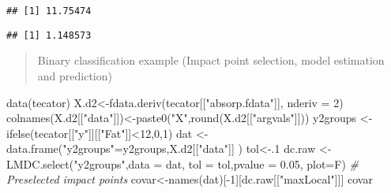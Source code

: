 \documentclass[
]{book}
\newenvironment{Shaded}{\begin{snugshade}}{\end{snugshade}}
\newcommand{\AttributeTok}[1]{\textcolor[rgb]{0.77,0.63,0.00}{#1}}
\newcommand{\CommentTok}[1]{\textcolor[rgb]{0.56,0.35,0.01}{\textit{#1}}}
\newcommand{\DecValTok}[1]{\textcolor[rgb]{0.00,0.00,0.81}{#1}}
\newcommand{\FloatTok}[1]{\textcolor[rgb]{0.00,0.00,0.81}{#1}}
\newcommand{\FunctionTok}[1]{\textcolor[rgb]{0.00,0.00,0.00}{#1}}
\newcommand{\NormalTok}[1]{#1}
\newcommand{\OtherTok}[1]{\textcolor[rgb]{0.56,0.35,0.01}{#1}}
\newcommand{\SpecialCharTok}[1]{\textcolor[rgb]{0.00,0.00,0.00}{#1}}
\newcommand{\StringTok}[1]{\textcolor[rgb]{0.31,0.60,0.02}{#1}}
\begin{document}
\begin{verbatim}
## [1] 11.75474
\end{verbatim}

\begin{Shaded}
\end{Shaded}

\begin{verbatim}
## [1] 1.148573
\end{verbatim}

\begin{quote}
Binary classification example (Impact point selection, model estimation and prediction)
\end{quote}

\begin{Shaded}
\begin{Highlighting}[]
\FunctionTok{data}\NormalTok{(tecator)}
\NormalTok{X.d2}\OtherTok{\textless{}{-}}\FunctionTok{fdata.deriv}\NormalTok{(tecator[[}\StringTok{"absorp.fdata"}\NormalTok{]],}
\AttributeTok{nderiv =} \DecValTok{2}\NormalTok{)}
\FunctionTok{colnames}\NormalTok{(X.d2[[}\StringTok{"data"}\NormalTok{]])}\OtherTok{\textless{}{-}}\FunctionTok{paste0}\NormalTok{(}\StringTok{"X"}\NormalTok{,}\FunctionTok{round}\NormalTok{(X.d2[[}\StringTok{"argvals"}\NormalTok{]]))}
\NormalTok{y2groups }\OtherTok{\textless{}{-}} \FunctionTok{ifelse}\NormalTok{(tecator[[}\StringTok{"y"}\NormalTok{]][[}\StringTok{"Fat"}\NormalTok{]]}\SpecialCharTok{\textless{}}\DecValTok{12}\NormalTok{,}\DecValTok{0}\NormalTok{,}\DecValTok{1}\NormalTok{)}
\NormalTok{dat }\OtherTok{\textless{}{-}} \FunctionTok{data.frame}\NormalTok{(}\StringTok{"y2groups"}\OtherTok{=}\NormalTok{y2groups,X.d2[[}\StringTok{"data"}\NormalTok{]] )}
\NormalTok{tol}\OtherTok{\textless{}{-}}\NormalTok{.}\DecValTok{1}
\NormalTok{dc.raw }\OtherTok{\textless{}{-}} \FunctionTok{LMDC.select}\NormalTok{(}\StringTok{"y2groups"}\NormalTok{,}\AttributeTok{data =}\NormalTok{ dat, }\AttributeTok{tol =}\NormalTok{ tol,}\AttributeTok{pvalue =} \FloatTok{0.05}\NormalTok{,}
\AttributeTok{plot=}\NormalTok{F)}
\CommentTok{\# Preselected impact points }
\NormalTok{covar}\OtherTok{\textless{}{-}}\FunctionTok{names}\NormalTok{(dat)[}\SpecialCharTok{{-}}\DecValTok{1}\NormalTok{][dc.raw[[}\StringTok{"maxLocal"}\NormalTok{]]]}
\NormalTok{covar}
\end{Highlighting}
\end{Shaded}
\end{document}
